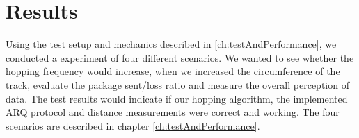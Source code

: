 \chapter{Results}\label{ch:results}

Using the test setup and mechanics described in \ref{ch:testAndPerformance}, we conducted a experiment of four different scenarios. We wanted to see whether the hopping frequency would increase, when we increased the circumference of the track, evaluate the package sent/loss ratio and measure the overall perception of data. The test results would indicate if our hopping algorithm, the implemented ARQ protocol and distance measurements were correct and working. The four scenarios are described in chapter \ref{ch:testAndPerformance}.